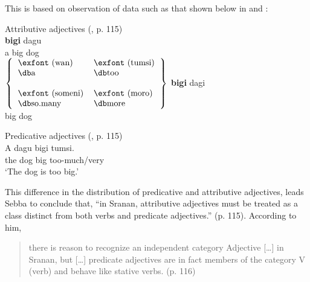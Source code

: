 This is based on observation of data such as that shown below in
 and :

\ea%
\label{ex:3:6}
Attributive adjectives (\citealt{Sebba1986}, p. 115)\\
 \ea
  \textbf{bigi}  {dagu}\\
       a big dog\\

  \ex 
  $\left\{ 
	  \begin{tabular}{ll}
	  \exfont (wan) & \exfont (tumsi)\\
	  {\db}a & {\db}too \\
	  \\
	  \exfont (someni) &\exfont (moro)\\
	  {\db}so.many & {\db}more \\
	  \end{tabular}
  \right\}$
  \gll \textbf{bigi} dagi\\
  big dog\\
  \z
\z


\ea%
\label{ex:3:7}
Predicative adjectives (\citealt{Sebba1986}, p. 115)\\
\ea
\gll A dagu bigi tumsi.\\
the dog big too-much\slash very\\
\glt `The dog is too big.'

\z
\z

This difference in the distribution of
predicative and attributive adjectives, leads Sebba to conclude that,
“in Sranan, attributive adjectives must be treated as a class distinct
from both verbs and predicate adjectives.” (p. 115). According to him,

\begin{quote}
there is reason to recognize an independent category Adjective […] in
Sranan, but […] predicate adjectives are in fact members of the
category V (verb) and behave like stative verbs. (p. 116)
\end{quote}

